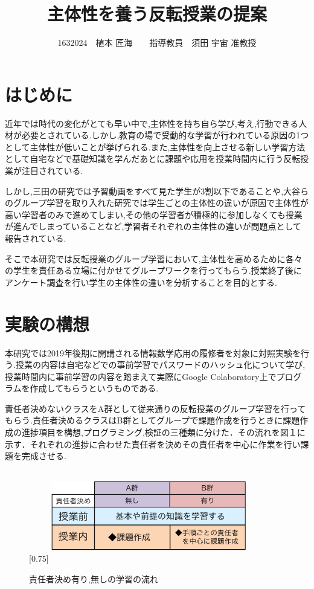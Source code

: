 \documentclass[twocolumn,10pt,a4j]{jsarticle}
\title{主体性を養う反転授業の提案}
\author{1632024　植本 匠海　　指導教員　須田 宇宙 准教授}
\date{}
\begin{document}
\maketitle

\section{はじめに}
近年では時代の変化がとても早い中で,主体性を持ち自ら学び,考え,行動できる人材が必要とされている.しかし,教育の場で受動的な学習が行われている原因の1つとして主体性が低いことが挙げられる.また,主体性を向上させる新しい学習方法として自宅などで基礎知識を学んだあとに課題や応用を授業時間内に行う反転授業が注目されている.

しかし,三田\cite{mita}の研究では予習動画をすべて見た学生が3割以下であることや,大谷ら\cite{ootani}のグループ学習を取り入れた研究では学生ごとの主体性の違いが原因で主体性が高い学習者のみで進めてしまい,その他の学習者が積極的に参加しなくても授業が進んでしまっていることなど,学習者それぞれの主体性の違いが問題点として報告されている.

そこで本研究では反転授業のグループ学習において,主体性を高めるために各々の学生を責任ある立場に付かせてグループワークを行ってもらう.授業終了後にアンケート調査を行い学生の主体性の違いを分析することを目的とする.

\section{実験の構想}
本研究では2019年後期に開講される情報数学応用の履修者を対象に対照実験を行う.授業の内容は自宅などでの事前学習でパスワードのハッシュ化について学び,授業時間内に事前学習の内容を踏まえて実際にGoogle Colaboratory上でプログラムを作成してもらうというものである.

責任者決めないクラスをA群として従来通りの反転授業のグループ学習を行ってもらう.責任者決めるクラスはB群としてグループで課題作成を行うときに課題作成の進捗項目を構想,プログラミング,検証の三種類に分けた．その流れを図１に示す．それぞれの進捗に合わせた責任者を決めその責任者を中心に作業を行い課題を完成させる.\newline


\begin{figure}[h]
\begin{center}
\scalebox{0.75}[0.75]{
 \includegraphics[clip,width=85mm,height=40mm]{nagare12.pdf}
 }
\end{center}
 \caption{責任者決め有り,無しの学習の流れ}
 \label{fig:流れ}
\end{figure}
\end{document}
